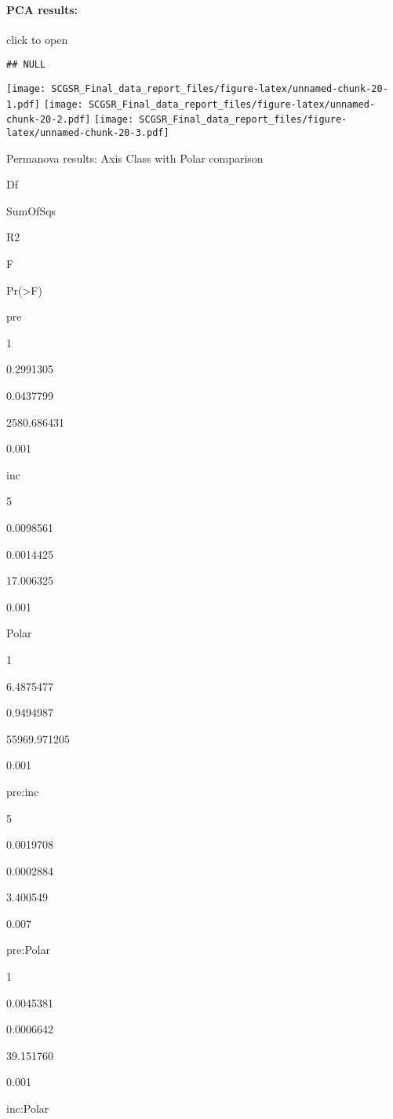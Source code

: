 \documentclass[
]{article}
\begin{document}
\hypertarget{pca-results}{%
\paragraph{PCA results:}\label{pca-results}}

click to open

\begin{verbatim}
## NULL
\end{verbatim}

\texttt{[image: SCGSR\_Final\_data\_report\_files/figure-latex/unnamed-chunk-20-1.pdf]}
\texttt{[image: SCGSR\_Final\_data\_report\_files/figure-latex/unnamed-chunk-20-2.pdf]}
\texttt{[image: SCGSR\_Final\_data\_report\_files/figure-latex/unnamed-chunk-20-3.pdf]}

Permanova results: Axis Class with Polar comparison

Df

SumOfSqs

R2

F

Pr(\textgreater F)

pre

1

0.2991305

0.0437799

2580.686431

0.001

inc

5

0.0098561

0.0014425

17.006325

0.001

Polar

1

6.4875477

0.9494987

55969.971205

0.001

pre:inc

5

0.0019708

0.0002884

3.400549

0.007

pre:Polar

1

0.0045381

0.0006642

39.151760

0.001

inc:Polar
\end{document}
